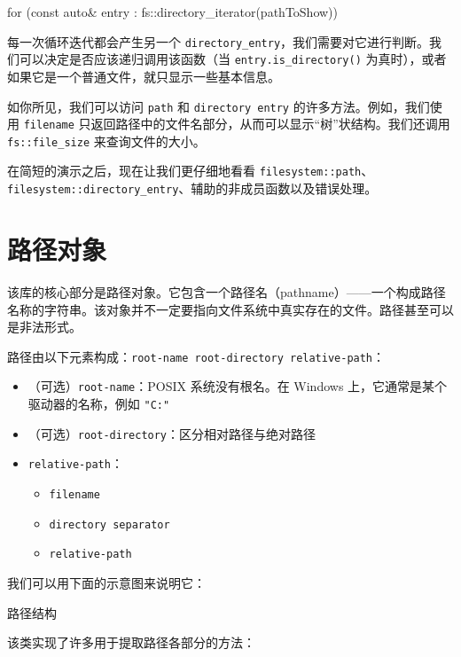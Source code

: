 \begin{codebox}[cpp]
for (const auto& entry : fs::directory_iterator(pathToShow))
\end{codebox}

每一次循环迭代都会产生另一个 \texttt{directory\_entry}，我们需要对它进行判断。我们可以决定是否应该递归调用该函数（当 \texttt{entry.is\_directory()} 为真时），或者如果它是一个普通文件，就只显示一些基本信息。

如你所见，我们可以访问 \texttt{path} 和 \texttt{directory entry} 的许多方法。例如，我们使用 \texttt{filename} 只返回路径中的文件名部分，从而可以显示“树”状结构。我们还调用 \texttt{fs::file\_size} 来查询文件的大小。

在简短的演示之后，现在让我们更仔细地看看 \texttt{filesystem::path}、\texttt{filesystem::directory\_entry}、辅助的非成员函数以及错误处理。

\section{路径对象}

该库的核心部分是路径对象。它包含一个路径名（pathname）——一个构成路径名称的字符串。该对象并不一定要指向文件系统中真实存在的文件。路径甚至可以是非法形式。


路径由以下元素构成：\texttt{root-name root-directory relative-path}：

\begin{itemize}
\item （可选）\texttt{root-name}：POSIX 系统没有根名。在 Windows 上，它通常是某个驱动器的名称，例如 \texttt{"C:"}
\item （可选）\texttt{root-directory}：区分相对路径与绝对路径
\item \texttt{relative-path}：
  \begin{itemize}
  \item \texttt{filename}
  \item \texttt{directory separator}
  \item \texttt{relative-path}
  \end{itemize}
\end{itemize}

我们可以用下面的示意图来说明它：

路径结构

该类实现了许多用于提取路径各部分的方法：

